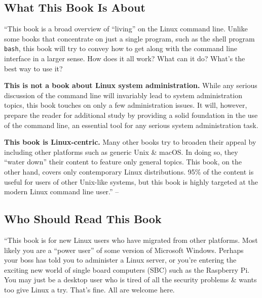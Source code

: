 \documentclass[oneside]{book}
\numberwithin{equation}{section}
\begin{document}
\subsection*{What This Book Is About}
``This book is a broad overview of ``living'' on the Linux command line. Unlike some books that concentrate on just a single program, such as the shell program \texttt{bash}, this book will try to convey how to get along with the command line interface in a larger sense. How does it all work? What can it do? What's the best way to use it?

\textbf{This is not a book about Linux system administration.} While any serious discussion of the command line will invariably lead to system administration topics, this book touches on only a few administration issues. It will, however, prepare the reader for additional study by providing a solid foundation in the use of the command line, an essential tool for any serious system administration task.

\textbf{This book is Linux-centric.} Many other books try to broaden their appeal by including other platforms such as generic Unix \& macOS. In doing so, they ``water down'' their content to feature only general topics. This book, on the other hand, covers only contemporary Linux distributions. 95\% of the content is useful for users of other Unix-like systems, but this book is highly targeted at the modern Linux command line user.'' -- \cite[p. 32]{Shotts2019}

\subsection*{Who Should Read This Book}
``This book is for new Linux users who have migrated from other platforms. Most likely you are a ``power user'' of some version of Microsoft Windows. Perhaps your boss has told you to administer a Linux server, or you're entering the exciting new world of single board computers (SBC) such as the Raspberry Pi. You may just be a desktop user who is tired of all the security problems \& wants too give Linux a try. That's fine. All are welcome here.
\end{document}
